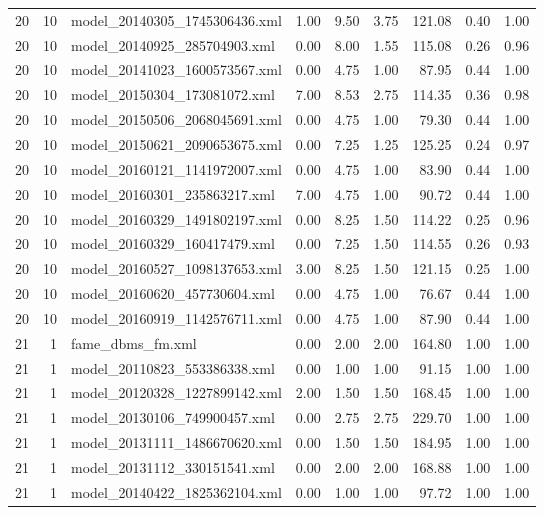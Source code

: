 \begin{table}[ht]
\begin{tabular}{rrlrrrrrr}
   20 &  10 & model\_20140305\_1745306436.xml & 1.00 & 9.50 & 3.75 & 121.08 & 0.40 & 1.00 \\ 
   20 &  10 & model\_20140925\_285704903.xml & 0.00 & 8.00 & 1.55 & 115.08 & 0.26 & 0.96 \\ 
   20 &  10 & model\_20141023\_1600573567.xml & 0.00 & 4.75 & 1.00 & 87.95 & 0.44 & 1.00 \\ 
   20 &  10 & model\_20150304\_173081072.xml & 7.00 & 8.53 & 2.75 & 114.35 & 0.36 & 0.98 \\ 
   20 &  10 & model\_20150506\_2068045691.xml & 0.00 & 4.75 & 1.00 & 79.30 & 0.44 & 1.00 \\ 
   20 &  10 & model\_20150621\_2090653675.xml & 0.00 & 7.25 & 1.25 & 125.25 & 0.24 & 0.97 \\ 
   20 &  10 & model\_20160121\_1141972007.xml & 0.00 & 4.75 & 1.00 & 83.90 & 0.44 & 1.00 \\ 
   20 &  10 & model\_20160301\_235863217.xml & 7.00 & 4.75 & 1.00 & 90.72 & 0.44 & 1.00 \\ 
   20 &  10 & model\_20160329\_1491802197.xml & 0.00 & 8.25 & 1.50 & 114.22 & 0.25 & 0.96 \\ 
   20 &  10 & model\_20160329\_160417479.xml & 0.00 & 7.25 & 1.50 & 114.55 & 0.26 & 0.93 \\ 
   20 &  10 & model\_20160527\_1098137653.xml & 3.00 & 8.25 & 1.50 & 121.15 & 0.25 & 1.00 \\ 
   20 &  10 & model\_20160620\_457730604.xml & 0.00 & 4.75 & 1.00 & 76.67 & 0.44 & 1.00 \\ 
   20 &  10 & model\_20160919\_1142576711.xml & 0.00 & 4.75 & 1.00 & 87.90 & 0.44 & 1.00 \\ 
   21 &   1 & fame\_dbms\_fm.xml & 0.00 & 2.00 & 2.00 & 164.80 & 1.00 & 1.00 \\ 
   21 &   1 & model\_20110823\_553386338.xml & 0.00 & 1.00 & 1.00 & 91.15 & 1.00 & 1.00 \\ 
   21 &   1 & model\_20120328\_1227899142.xml & 2.00 & 1.50 & 1.50 & 168.45 & 1.00 & 1.00 \\ 
   21 &   1 & model\_20130106\_749900457.xml & 0.00 & 2.75 & 2.75 & 229.70 & 1.00 & 1.00 \\ 
   21 &   1 & model\_20131111\_1486670620.xml & 0.00 & 1.50 & 1.50 & 184.95 & 1.00 & 1.00 \\ 
   21 &   1 & model\_20131112\_330151541.xml & 0.00 & 2.00 & 2.00 & 168.88 & 1.00 & 1.00 \\ 
   21 &   1 & model\_20140422\_1825362104.xml & 0.00 & 1.00 & 1.00 & 97.72 & 1.00 & 1.00 \\ 

\end{tabular}
\end{table}
